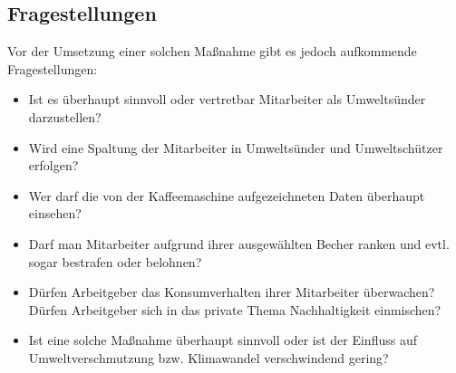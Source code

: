 \documentclass[a4paper,12pt,]{article}
\begin{document}
\subsection{Fragestellungen}
Vor der Umsetzung einer solchen Maßnahme gibt es jedoch
aufkommende Fragestellungen:
\begin{itemize}
\item
Ist es überhaupt sinnvoll oder vertretbar Mitarbeiter als
Umweltsünder darzustellen?
\item
Wird eine Spaltung der Mitarbeiter in Umweltsünder und
Umweltschützer erfolgen?

\item
Wer darf die von der Kaffeemaschine aufgezeichneten Daten
überhaupt einsehen?

\item
Darf man Mitarbeiter aufgrund ihrer ausgewählten Becher
ranken und evtl. sogar bestrafen oder belohnen?

\item
Dürfen Arbeitgeber das Konsumverhalten ihrer Mitarbeiter
überwachen? Dürfen Arbeitgeber sich in das private Thema
Nachhaltigkeit einmischen?

\item
Ist eine solche Maßnahme überhaupt sinnvoll oder ist der
Einfluss auf Umweltverschmutzung bzw. Klimawandel
verschwindend gering?
\end{itemize}
\end{document}
